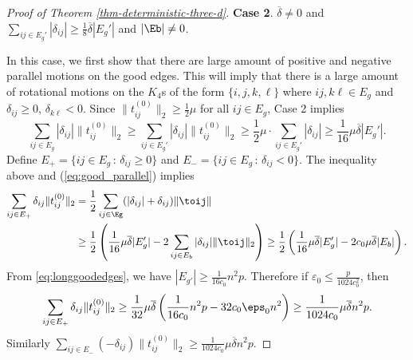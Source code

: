 \begin{proof}[Proof of Theorem \ref{thm-deterministic-three-d}]
\medskip{}


\noindent\textbf{Case 2}. $\overline{\delta} \neq 0$ and $\sum_{ij\in E_{g}'}|\delta_{ij}|\ge\frac{1}{8}\overline{\delta}|E_{g}'|$ and $|\Eb| \neq 0$.

In this case, we first show that there are large amount of positive
and negative parallel motions on the good edges. This will imply that
there is a large amount of rotational motions on the $K_{4}$s of
the form $\{i,j,k,\ell\}$ where $ij,k\ell\in E_{g}$ and $\delta_{ij}\ge0$,
$\delta_{k\ell}<0$. Since $\|t_{ij}^{(0)}\|_2 \ge \frac{1}{2}\mu$ for all $ij \in E_g$, 
Case 2 implies 
\[
	\sum_{ij\in E_{g}}|\delta_{ij}|\|t_{ij}^{(0)}\|_2
	\ge\sum_{ij\in E_{g}'}|\delta_{ij}|\|t_{ij}^{(0)}\|_2
	\ge\frac{1}{2}\mu\cdot\sum_{ij\in E_{g}'}|\delta_{ij}|
	\ge\frac{1}{16}\mu\overline{\delta}|E_{g}'|.
\]
Define $E_{+}=\{ij\in E_{g}\,:\,\delta_{ij}\ge0\}$ and $E_{-}=\{ij\in E_{g}\,:\,\delta_{ij}<0\}$.
The inequality above and (\ref{eq:good_parallel}) implies
\begin{align*}
	\sum_{ij\in E_{+}}\delta_{ij}\|t_{ij}^{(0)}\|_2 
	&= \frac{1}{2} \sum_{ij \in \Eg} (|\delta_{ij}| + \delta_{ij}) \| \toij\| \\
	&\ge \frac{1}{2}\left(\frac{1}{16}\mu\overline{\delta}|E_{g}'| - 2\sum_{ij \in E_b} |\delta_{ij}|\|\toij\|_2 \right)
  \ge  \frac{1}{2}\left(\frac{1}{16}\mu\overline{\delta}|E_{g}'|-2c_{0}\mu\overline{\delta}|E_{b}|\right).
\end{align*}
From \eqref{eq:longgoodedges}, we have $|E_{g'}| \ge \frac{1}{16c_0}n^2p$.
Therefore if $\varepsilon_0 \le \frac{p}{1024c_0^2}$, then 
\[
	\sum_{ij\in E_{+}}\delta_{ij}\|t_{ij}^{(0)}\|_2 
	\ge \frac{1}{32}\mu\overline{\delta}\left(\frac{1}{16c_0}n^{2}p-32c_0 \eps_0 n^2\right)
	\ge\frac{1}{1024c_0}\mu\overline{\delta}n^{2}p.
\]
Similarly $\sum_{ij\in E_{-}}(-\delta_{ij})\|t_{ij}^{(0)}\|_2\ge\frac{1}{1024c_0}\mu\overline{\delta}n^{2}p$.


\end{proof}
